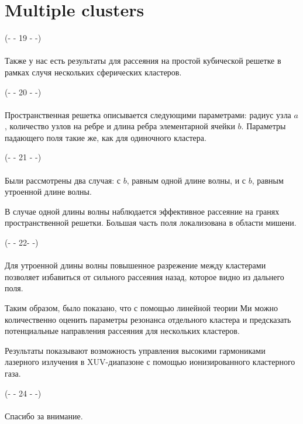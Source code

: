 \section{Multiple clusters}

\noindent(- - 19 - -)\\~\\

Также у нас есть результаты для рассеяния на простой кубической решетке в рамках случя нескольких сферических кластеров.

\noindent(- - 20 - -)\\~\\
Пространственная решетка описывается следующими параметрами: радиус узла $a$, количество узлов на ребре и длина ребра элементарной ячейки $b$. Параметры падающего поля такие же, как для одиночного кластера.

\noindent(- - 21 - -)\\~\\
Были рассмотрены два случая: с $b$, равным одной длине волны, и с $b$, равным утроенной длине волны.

В случае одной длины волны наблюдается эффективное рассеяние на гранях пространственной решетки. Большая часть поля локализована в области мишени.

\noindent(- - 22- -)\\~\\
Для утроенной длины волны повышенное разрежение между кластерами позволяет избавиться от сильного рассеяния назад, которое видно из дальнего поля. 

Таким образом, было показано, что с помощью линейной теории Ми можно количественно оценить параметры резонанса отдельного кластера и предсказать потенциальные направления рассеяния для нескольких кластеров.

Результаты показывают возможность управления высокими гармониками лазерного излучения в XUV-диапазоне с помощью ионизированного кластерного газа.

\noindent(- - 24 - -)\\~\\

Спасибо за внимание.